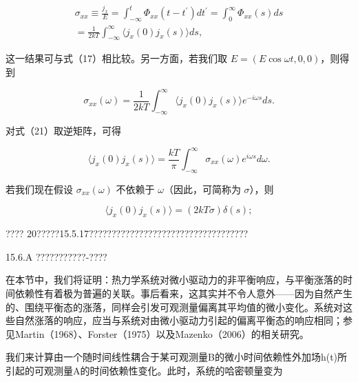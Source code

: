 \begin{equation}\tag{15.4.72}\label{eq:15.4.72}
\begin{array}{r} { \sigma _ { x x } \equiv \frac { j _ { x } } { E } = \int _ { - \infty } ^{t} \Phi _ { x x } ( t - t ^{\prime} ) d t ^{\prime} = \int _ { 0 } ^{\infty} \Phi _ { x x } ( s ) d s } \\{ = \frac { 1 } { 2 k T } \int _ { - \infty } ^{\infty} \langle j _ { x } ( 0 ) j _ { x } ( s ) \rangle d s , } \end{array}
\end{equation}

这一结果可与式（17）相比较。另一方面，若我们取 \(E=(E\cos\omega t,0,0)\)，则得到

\begin{equation}\tag{15.4.73}\label{eq:15.4.73}
\sigma _ { x x } ( \omega ) = \frac { 1 } { 2 k T } \int _ { - \infty } ^{\infty} \langle j _ { x } ( 0 ) j _ { x } ( s ) \rangle e ^{- i \omega s} d s .
\end{equation}

对式（21）取逆矩阵，可得

\begin{equation}\tag{15.4.74}\label{eq:15.4.74}
\langle j _ { x } ( 0 ) j _ { x } ( s ) \rangle = \frac { k T } { \pi } \int _ { - \infty } ^{\infty} \sigma _ { x x } ( \omega ) e ^{i \omega s} d \omega .
\end{equation}

若我们现在假设 \(\sigma_{xx}(\omega)\) 不依赖于 \(\omega\)（因此，可简称为 \(\sigma\)），则

\begin{equation}\tag{15.4.75}\label{eq:15.4.75}
\langle j _ { x } ( 0 ) j _ { x } ( s ) \rangle = ( 2 k T \sigma ) \delta ( s ) ;
\end{equation}

???? 20?????15.5.17???????????????????????????????????

15.6.A ???????????-????

在本节中，我们将证明：热力学系统对微小驱动力的非平衡响应，与平衡涨落的时间依赖性有着极为普遍的关联。事后看来，这其实并不令人意外------因为自然产生的、围绕平衡态的涨落，同样会引发可观测量偏离其平均值的微小变化。系统对这些自然涨落的响应，应当与系统对由微小驱动力引起的偏离平衡态的响应相同；参见Martin（1968）、Forster（1975）以及Mazenko（2006）的相关研究。

我们来计算由一个随时间线性耦合于某可观测量B的微小时间依赖性外加场h(t)所引起的可观测量A的时间依赖性变化。此时，系统的哈密顿量变为

